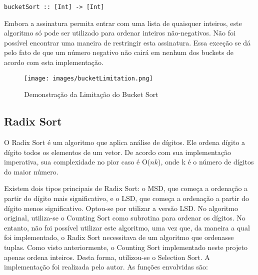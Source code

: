 \documentclass[12pt,a4paper]{article}
\begin{document}
\begin{lstlisting}
bucketSort :: [Int] -> [Int]
\end{lstlisting}

Embora a assinatura permita entrar com uma lista de quaisquer inteiros, este algoritmo só pode ser utilizado para ordenar inteiros não-negativos. Não foi possível encontrar uma maneira de restringir esta assinatura. Essa exceção se dá pelo fato de que um número negativo não cairá em nenhum dos buckets de acordo com esta implementação.

\begin{figure}[h]
	\centering
	\texttt{[image: images/bucketLimitation.png]}
	\caption{Demonstração da Limitação do Bucket Sort}
\end{figure}


\subsection{Radix Sort}
O Radix Sort é um algoritmo que aplica análise de dígitos. Ele ordena dígito a dígito todos os elementos de um vetor. De acordo com sua implementação imperativa, sua complexidade no pior caso é O($nk$), onde k é o número de dígitos do maior número.

Existem dois tipos principais de Radix Sort: o MSD, que começa a ordenação a partir do dígito mais significativo, e o LSD, que começa a ordenação a partir do dígito menos significativo. Optou-se por utilizar a versão LSD. No algoritmo original, utiliza-se o Counting Sort como subrotina para ordenar os dígitos. No entanto, não foi possível utilizar este algoritmo, uma vez que, da maneira a qual foi implementado, o Radix Sort necessitava de um algoritmo que ordenasse tuplas. Como visto anteriormente, o Counting Sort implementado neste projeto apenas ordena inteiros. Desta forma, utilizou-se o Selection Sort. A implementação foi realizada pelo autor. As funções envolvidas são:
\end{document}
